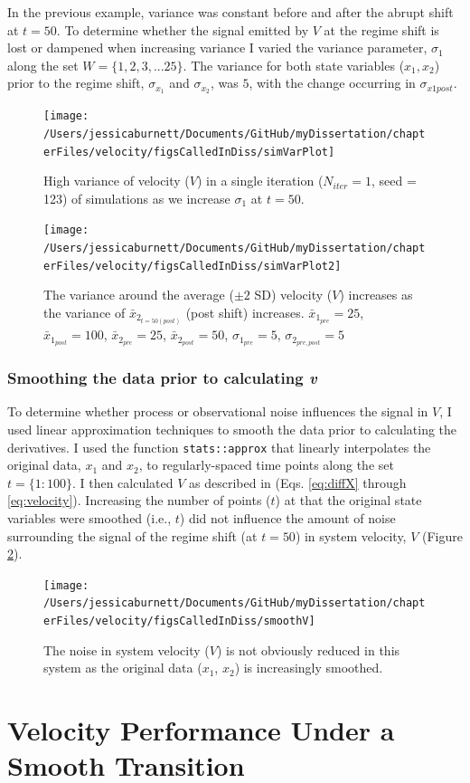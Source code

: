 \documentclass[12pt,twoside,openany]{reedthesis}
\begin{document}
In the previous example, variance was constant before and after the abrupt shift at \(t=50\). To determine whether the signal emitted by \(V\) at the regime shift is lost or dampened when increasing variance I varied the variance parameter, \(\sigma_1\) along the set \(W = \{1,2,3,...25 \}\). The variance for both state variables (\(x_1, x_2\)) prior to the regime shift, \(\sigma_{x_1}\) and \(\sigma_{x_2}\), was \(5\), with the change occurring in \(\sigma_{x1post}\).
\begin{figure}
\texttt{[image: /Users/jessicaburnett/Documents/GitHub/myDissertation/chapterFiles/velocity/figsCalledInDiss/simVarPlot]} \caption{High variance of velocity ($V$) in a single iteration ($N_{iter}=1$, seed = 123) of simulations as we increase $\sigma_1$ at $t=50$.}\label{fig:simVarPlot}
\end{figure}
\begin{figure}
\texttt{[image: /Users/jessicaburnett/Documents/GitHub/myDissertation/chapterFiles/velocity/figsCalledInDiss/simVarPlot2]} \caption{The variance around the average ($\pm2$ SD) velocity ($V$) increases as the variance of $\bar{x}_{2_{t=50 (post)}}$ (post shift) increases. $\bar{x}_{1_{pre}} = 25$, $\bar{x}_{1_{post}} = 100$, $\bar{x}_{2_{pre}} = 25$, $\bar{x}_{2_{post}} = 50$, $\sigma_{1_{pre}} = 5$, $\sigma_{2_{pre,post}} = 5$}\label{fig:simVarPlot2}
\end{figure}
\hypertarget{smoothing-the-data-prior-to-calculating-v}{%
\subsubsection{\texorpdfstring{Smoothing the data prior to calculating \emph{v}}{Smoothing the data prior to calculating v}}\label{smoothing-the-data-prior-to-calculating-v}}

To determine whether process or observational noise influences the signal in \(V\), I used linear approximation techniques to smooth the data prior to calculating the derivatives. I used the function \texttt{stats::approx} that linearly interpolates the original data, \(x_1\) and \(x_2\), to regularly-spaced time points along the set \(t=\{1:100\}\). I then calculated \(V\) as described in (Eqs. \eqref{eq:diffX} through \eqref{eq:velocity}). Increasing the number of points (\(t\)) at that the original state variables were smoothed (i.e., \(t\)) did not influence the amount of noise surrounding the signal of the regime shift (at \(t=50\)) in system velocity, \(V\) (Figure \ref{fig:simVarPlot2}).
\begin{figure}
\texttt{[image: /Users/jessicaburnett/Documents/GitHub/myDissertation/chapterFiles/velocity/figsCalledInDiss/smoothV]} \caption{The noise in system velocity ($V$) is not obviously reduced in this system as the original data ($x_1$, $x_2$) is increasingly smoothed.}\label{fig:smoothV}
\end{figure}
\hypertarget{velocity-performance-under-a-smooth-transition}{%
\section{Velocity Performance Under a Smooth Transition}\label{velocity-performance-under-a-smooth-transition}}
\end{document}
